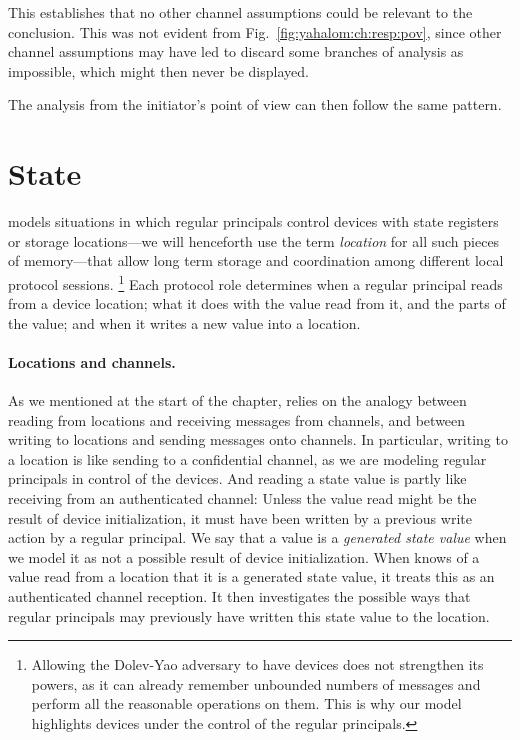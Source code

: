 This establishes that no other channel assumptions could be relevant
to the conclusion.  This was not evident from
Fig.~\ref{fig:yahalom:ch:resp:pov}, since other channel assumptions
may have led {\cpsa} to discard some branches of analysis as
impossible, which might then never be displayed.

The analysis from the initiator's point of view can then follow the
same pattern.  

\section{State}
\label{sec:channels:state:state}

{\cpsa} models situations in which regular principals control devices
with state registers or storage locations---we will henceforth use the
term \emph{location} for all such pieces of memory---that allow long
term storage and coordination among different local protocol sessions.%
%
\footnote{Allowing the Dolev-Yao adversary to have devices does not
  strengthen its powers, as it can already remember unbounded numbers
  of messages and perform all the reasonable operations on them.  This
  is why our model highlights devices under the control of the regular
  principals.}
%
Each protocol role determines when a regular principal reads from a
device location; what it does with the value read from it, and the
parts of the value; and when it writes a new value into a location.

\paragraph{Locations and channels.}  As we mentioned at the start of
the chapter, {\cpsa} relies on the analogy between reading from
locations and receiving messages from channels, and between writing to
locations and sending messages onto channels.  In particular, writing
to a location is like sending to a confidential channel, as we are
modeling regular principals in control of the devices.  And reading a
state value is partly like receiving from an authenticated channel:
Unless the value read might be the result of device initialization, it
must have been written by a previous write action by a regular
principal.  We say that a value is a \emph{generated state value} when
we model it as not a possible result of device initialization.  When
{\cpsa} knows of a value read from a location that it is a generated
state value, it treats this as an authenticated channel reception.  It
then investigates the possible ways that regular principals may
previously have written this state value to the location.

